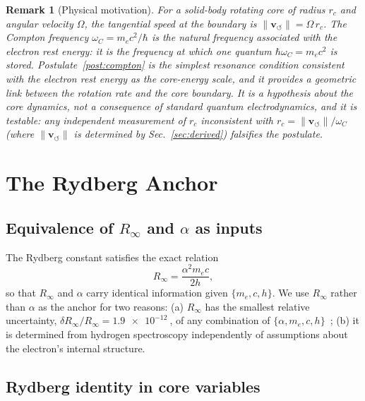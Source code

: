 \documentclass[aps,pra,preprint,longbibliography,nofootinbib]{revtex4-2}
\newtheorem{remark}{Remark}
\newcommand{\vnorm}{\lVert\mathbf{v}_{\!\boldsymbol{\circlearrowleft}}\rVert} %
\newcommand{\rc}{r_c}                            %
\newcommand{\omC}{\omega_C}                      %
\newcommand{\Rinf}{R_\infty}                     %
\begin{document}
\begin{remark}[Physical motivation]
\label{rem:motivation}
For a solid-body rotating core of radius $\rc$ and angular
velocity $\Omega$, the tangential speed at the boundary is
$\vnorm = \Omega\,\rc$.
The Compton frequency $\omC = m_e c^2/\hbar$ is the natural
frequency associated with the electron rest energy: it is the
frequency at which one quantum $\hbar\omC = m_e c^2$ is stored.
Postulate~\ref{post:compton} is the simplest resonance condition
consistent with the electron rest energy as the core-energy scale,
and it provides a geometric link between the rotation rate and the
core boundary.
It is a hypothesis about the core dynamics, not a consequence of
standard quantum electrodynamics, and it is testable: any
independent measurement of $\rc$ inconsistent with
$\rc = \vnorm/\omC$ (where $\vnorm$ is determined by
Sec.~\ref{sec:derived}) falsifies the postulate.
\end{remark}

\section{The Rydberg Anchor}
\label{sec:rydberg}

\subsection{Equivalence of $\Rinf$ and $\alpha$ as inputs}

The Rydberg constant satisfies the exact relation
\begin{equation}
  \Rinf = \frac{\alpha^2 m_e c}{2h},
  \label{eq:Rydberg_standard}
\end{equation}
so that $\Rinf$ and $\alpha$ carry identical information given
$\{m_e, c, h\}$.
We use $\Rinf$ rather than $\alpha$ as the anchor for two reasons:
(a) $\Rinf$ has the smallest relative uncertainty,
$\delta\Rinf/\Rinf = \SI{1.9e-12}{}$, of any combination of
$\{\alpha, m_e, c, h\}$~\cite{MohrTaylor2018};
(b) it is determined from hydrogen spectroscopy independently of
assumptions about the electron's internal structure.

\subsection{Rydberg identity in core variables}
\end{document}
